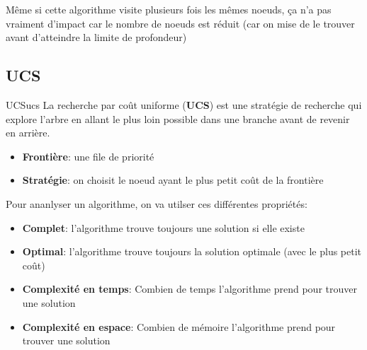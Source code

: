 \documentclass[a4paper, 12pt]{extarticle}
\begin{document}
\begin{remark}\leavevmode
    Même si cette algorithme visite plusieurs fois les mêmes noeuds, ça n'a pas vraiment d'impact
    car le nombre de noeuds est réduit (car on mise de le trouver avant d'atteindre la limite de profondeur)
\end{remark}



\subsection{UCS} %
\label{sub:ucs} 

\begin{definition}{UCS}{ucs}
    La recherche par coût uniforme (\textbf{UCS}) est une stratégie de recherche qui explore l'arbre en allant le plus loin possible dans une branche avant de revenir en arrière. 
    \begin{itemize}
        \item \textbf{Frontière}: une file de priorité
        \item \textbf{Stratégie}: on choisit le noeud ayant le plus petit coût de la frontière
    \end{itemize} 
\end{definition} 




Pour ananlyser un algorithme, on va utilser ces différentes propriétés:
\begin{itemize}
    \item \textbf{Complet}: l'algorithme trouve toujours une solution si elle existe
    \item \textbf{Optimal}: l'algorithme trouve toujours la solution optimale (avec le plus petit coût)
    \item \textbf{Complexité en temps}: Combien de temps l'algorithme prend pour trouver une solution
    \item \textbf{Complexité en espace}: Combien de mémoire l'algorithme prend pour trouver une solution
\end{itemize}
\end{document}
